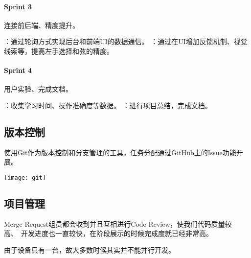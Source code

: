             \paragraph{Sprint 3} 连接前后端、精度提升。
            \begin{enumerate}
                ：通过轮询方式实现后台和前端UI的数据通信。
                ：通过在UI增加反馈机制、视觉线索等，提高左手选择和弦的精度。
            \end{enumerate}

            \paragraph{Sprint 4} 用户实验、完成文档。
            \begin{enumerate}
                ：收集学习时间、操作准确度等数据。
                ：进行项目总结，完成文档。
            \end{enumerate}

        \subsection{版本控制}
        使用Git作为版本控制和分支管理的工具，任务分配通过GitHub上的Issue功能开展。

        \texttt{[image: git]}

        \subsection{项目管理}
        Merge Request组员都会收到并且互相进行Code Review，使我们代码质量较高、\
        开发进度也一直较快，在阶段展示的时候完成度就已经非常高。

        由于设备只有一台，故大多数时候其实并不能并行开发。
